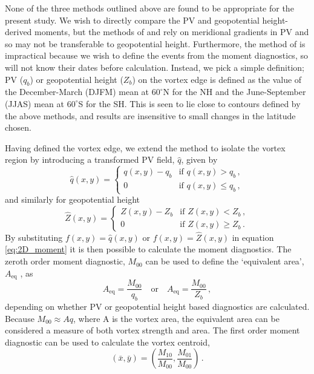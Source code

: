 None of the three methods outlined above are found to be appropriate for the
present study. We wish to directly compare the PV and geopotential
height-derived moments, but the methods of \citet{Waugh1999} and
\citet{Nash1996} rely on meridional gradients in PV and so may not be
transferable to geopotential height. Furthermore, the method of
\citet{Matthewman2009} is impractical because we wish to define the events from
the moment diagnostics, so will not know their dates before
calculation. Instead, we pick a simple definition; PV ($q_{b}$) or geopotential
height ($Z_{b}$) on the vortex edge is defined as the value of the
December-March (DJFM) mean at $60^{\circ}$N for the NH and the
June-September (JJAS) mean at $60^{\circ}$S for the SH. This is
seen to lie close to contours defined by the above methods, and results are
insensitive to small changes in the latitude chosen.

Having defined the vortex edge, we extend the method \citet{Matthewman2009} to
isolate the vortex region by introducing a transformed PV field, $\hat{q}$,
given by
\begin{equation}
 \hat{q}(x,y) = 
 \begin{cases}
   q(x,y) - q_{b} & \text{if $q(x,y) > q_{b}$} \, , \\
   0 & \text{if $q(x,y) \leq q_{b}$} \, , 
 \end{cases}
\end{equation}
and similarly for geopotential height 
\begin{equation}
 \hat{Z}(x,y) = 
 \begin{cases}
   Z(x,y) - Z_{b} & \text{if $Z(x,y) < Z_{b}$} \, , \\
   0 & \text{if $Z(x,y) \geq Z_{b}$} \, . 
 \end{cases}
\end{equation}
By substituting $f(x,y) = \hat{q}(x,y)$ or $f(x,y) = \hat{Z}(x,y)$ in equation
\ref{eq:2D_moment} it is then possible to calculate the moment diagnostics. The
zeroth order moment diagnostic, $M_{00}$ can be used to define the `equivalent
area', $A_{\mathrm{eq}}$ \citep{Matthewman2009}, as
\begin{equation} 
A_{\mathrm{eq}} = \frac{M_{00}}{q_{b}}\quad \text{or} \quad A_{\mathrm{eq}} = \frac{M_{00}}{Z_b}\, ,
\end{equation}
depending on whether PV or geopotential height based diagnostics are
calculated. Because $M_{00} \approx Aq$, where A is the vortex area, the
equivalent area can be considered a measure of both vortex strength and
area. The first order moment diagnostic can be used to calculate the vortex
centroid,
\begin{equation}
(\bar{x}, \bar{y}) = \left( \frac{M_{10}}{M_{00}}, \frac{M_{01}}{M_{00}} \right)
\, . 
\end{equation}

